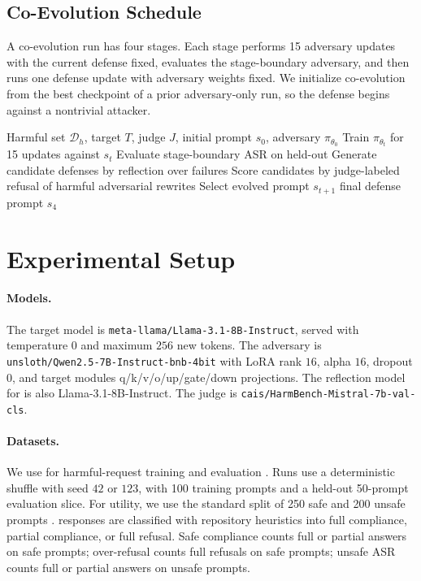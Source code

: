 \subsection{Co-Evolution Schedule}

A co-evolution run has four stages. 
Each stage performs 15 \rloo{} adversary updates with the current defense fixed, evaluates the stage-boundary adversary, and then runs one \gepa{} defense update with adversary weights fixed.
We initialize co-evolution from the best checkpoint of a prior adversary-only run, so the defense begins against a nontrivial attacker.
\begin{algorithm}[t]
\caption{Co-evolutionary prompt defense}
\label{alg:coev}
\begin{algorithmic}[1]
\Require Harmful set $\mathcal{D}_{h}$, target $T$, judge $J$, initial prompt $s_0$, adversary $\pi_{\theta_0}$
    \State Train $\pi_{\theta_t}$ for 15 \rloo{} updates against $s_t$
    \State Evaluate stage-boundary ASR on held-out \harmbench{}
    \State Generate candidate defenses by reflection over failures
    \State Score candidates by judge-labeled refusal of harmful adversarial rewrites
    \State Select evolved prompt $s_{t+1}$
\EndFor
\State \Return final defense prompt $s_4$
\end{algorithmic}
\end{algorithm}

\section{Experimental Setup}

\paragraph{Models.}
The target model is \texttt{meta-llama/Llama-3.1-8B-Instruct}, served with temperature $0$ and maximum $256$ new tokens.
The adversary is \texttt{unsloth/Qwen2.5-7B-Instruct-bnb-4bit} with LoRA rank $16$, alpha $16$, dropout $0$, and target modules q/k/v/o/up/gate/down projections.
The reflection model for \gepa{} is also Llama-3.1-8B-Instruct. 
The judge is \texttt{cais/HarmBench-Mistral-7b-val-cls}.
\paragraph{Datasets.}
We use \harmbench{} for harmful-request training and evaluation \citep{mazeika2024harmbench}. 
Runs use a deterministic shuffle with seed $42$ or $123$, with 100 training prompts and a held-out 50-prompt evaluation slice.
For utility, we use the standard \xstest{} split of 250 safe and 200 unsafe prompts \citep{rottger2024xstest}.
\xstest{} responses are classified with repository heuristics into full compliance, partial compliance, or full refusal.
Safe compliance counts full or partial answers on safe prompts; over-refusal counts full refusals on safe prompts;
unsafe ASR counts full or partial answers on unsafe prompts.
